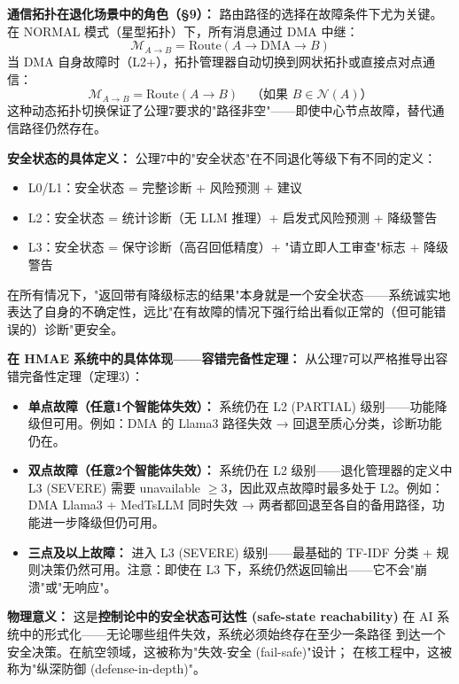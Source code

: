 \documentclass[11pt,a4paper]{ctexart}
\theoremstyle{remark}
\begin{document}
\textbf{通信拓扑在退化场景中的角色（§9）：} 路由路径的选择在故障条件下尤为关键。在 NORMAL 模式（星型拓扑）下，所有消息通过 DMA 中继：
\[
\mathcal{M}_{A \to B} = \text{Route}(A \to \text{DMA} \to B)
\]
当 DMA 自身故障时（L2+），拓扑管理器自动切换到网状拓扑或直接点对点通信：
\[
\mathcal{M}_{A \to B} = \text{Route}(A \to B) \quad \text{（如果 } B \in \mathcal{N}(A) \text{）}
\]
这种动态拓扑切换保证了公理7要求的"路径非空"——即使中心节点故障，替代通信路径仍然存在。

\textbf{安全状态的具体定义：} 公理7中的"安全状态"在不同退化等级下有不同的定义：
\begin{itemize}[nosep]
\item L0/L1：安全状态 = 完整诊断 + 风险预测 + 建议
\item L2：安全状态 = 统计诊断（无 LLM 推理）+ 启发式风险预测 + 降级警告
\item L3：安全状态 = 保守诊断（高召回低精度）+ "请立即人工审查"标志 + 降级警告
\end{itemize}
在所有情况下，"返回带有降级标志的结果"本身就是一个安全状态——系统诚实地表达了自身的不确定性，远比"在有故障的情况下强行给出看似正常的（但可能错误的）诊断"更安全。

\textbf{在 HMAE 系统中的具体体现——容错完备性定理：} 从公理7可以严格推导出容错完备性定理（定理3）：
\begin{itemize}[nosep]
\item \textbf{单点故障（任意1个智能体失效）：} 系统仍在 L2 (PARTIAL) 级别——功能降级但可用。例如：DMA 的 Llama3 路径失效 → 回退至质心分类，诊断功能仍在。
\item \textbf{双点故障（任意2个智能体失效）：} 系统仍在 L2 级别——退化管理器的定义中 L3 (SEVERE) 需要 unavailable $\geq 3$，因此双点故障时最多处于 L2。例如：DMA Llama3 + MedTsLLM 同时失效 → 两者都回退至各自的备用路径，功能进一步降级但仍可用。
\item \textbf{三点及以上故障：} 进入 L3 (SEVERE) 级别——最基础的 TF-IDF 分类 + 规则决策仍然可用。注意：即使在 L3 下，系统仍然返回输出——它不会"崩溃"或"无响应"。
\end{itemize}

\textbf{物理意义：} 这是\textbf{控制论中的安全状态可达性 (safe-state reachability)}
在 AI 系统中的形式化——无论哪些组件失效，系统必须始终存在至少一条路径
到达一个安全决策。在航空领域，这被称为"失效-安全 (fail-safe)"设计；
在核工程中，这被称为"纵深防御 (defense-in-depth)"。
\end{document}
